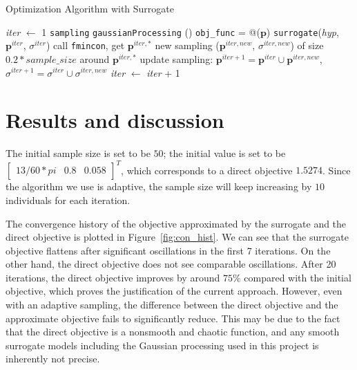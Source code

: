 \documentclass[a4paper]{article}
\begin{document}
\begin{algorithm}
  
  \caption{Optimization Algorithm with Surrogate}
  \label{alg:opt}
    \textit{iter} $\gets$ 1\;
    \texttt{sampling}\;
    {
      \texttt{gaussianProcessing} ()\;
      \texttt{obj\_func} = @($\bm{p}$) \texttt{surrogate}(\textit{hyp}, $\bm{p}^{iter}$, $\sigma^{iter}$)\;
      call \texttt{fmincon}, get $\bm{p}^{iter,*}$\;
      {
        new sampling ($\bm{p}^{iter,new}$, $\sigma^{iter,new}$) of size $0.2*sample\_size$ around $\bm{p}^{iter,*}$\;
        update sampling: $\bm{p}^{iter+1} = \bm{p}^{iter} \cup \bm{p}^{iter,new}$, $\sigma^{iter+1} = \sigma^{iter} \cup \sigma^{iter,new}$
      }
      \textit{iter} $\gets$ \textit{iter} + 1
    }      
\end{algorithm}

\section{Results and discussion}
The initial sample size is set to be $50$; the initial value is set to be $\begin{bmatrix}
13/60*pi & 0.8& 0.058
\end{bmatrix}^T$, which corresponds to a direct objective $1.5274$. Since the algorithm we use is adaptive, the sample size will keep increasing by $10$ individuals for each iteration. 

The convergence history of the objective approximated by the surrogate and the direct objective is plotted in Figure~\ref{fig:con_hist}. We can see that the surrogate objective flattens after significant oscillations in the first 7 iterations. On the other hand, the direct objective does not see comparable oscillations. After 20 iterations, the direct objective improves by around $75\%$ compared with the initial objective, which proves the justification of the current approach. However, even with an adaptive sampling, the difference between the direct objective and the approximate objective fails to significantly reduce. This may be due to the fact that the direct objective is a nonsmooth and chaotic function, and any smooth surrogate models including the Gaussian processing used in this project is inherently not precise.
\end{document}
